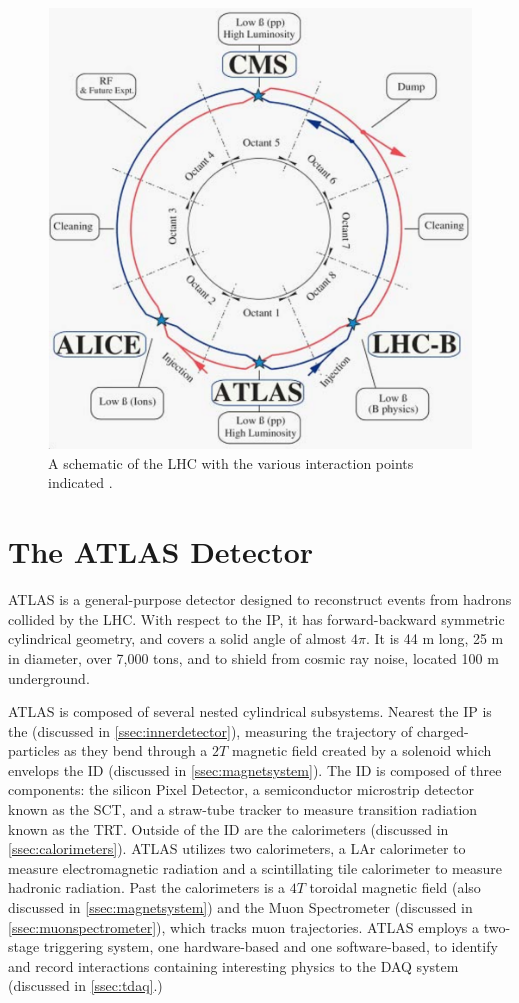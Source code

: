 \begin{figure}[!ht]
    \centering
    \includegraphics[width=.7\textwidth]{chapters/chapter2_experiment/images/lhc_interaction_points.png}
    \caption{A schematic of the LHC with the various interaction points indicated \cite{lhc}.}
    \label{fig:lhc}
\end{figure}


\section{The ATLAS Detector}

ATLAS \cite{atlas-experiment} is a general-purpose detector designed to reconstruct events from hadrons collided by the \gls{LHC}. With respect to the \gls{IP}, it has forward-backward symmetric cylindrical geometry, and covers a solid angle of almost $4\pi$. It is 44 m long, 25 m in diameter, over 7,000 tons, and to shield from cosmic ray noise, located 100 m underground. 

ATLAS is composed of several nested cylindrical subsystems. Nearest the \gls{IP} is the  (discussed in \ref{ssec:innerdetector}), measuring the trajectory of charged-particles as they bend through a $\unit{2}{T}$ magnetic field created by a solenoid which envelops the \gls{ID} (discussed in \ref{ssec:magnetsystem}). The \gls{ID} is composed of three components: the silicon Pixel Detector, a semiconductor microstrip detector known as the \gls{SCT}, and a straw-tube tracker to measure transition radiation known as the \gls{TRT}. Outside of the \gls{ID} are the calorimeters (discussed in \ref{ssec:calorimeters}). ATLAS utilizes two calorimeters, a \gls{LAr} calorimeter to measure electromagnetic radiation and a scintillating tile calorimeter to measure hadronic radiation. Past the calorimeters is a $\unit{4}{T}$ toroidal magnetic field (also discussed in \ref{ssec:magnetsystem}) and the Muon Spectrometer (discussed in \ref{ssec:muonspectrometer}), which tracks muon trajectories. ATLAS employs a two-stage triggering system, one hardware-based and one software-based, to identify and record interactions containing interesting physics to the \gls{DAQ} system (discussed in \ref{ssec:tdaq}.)

